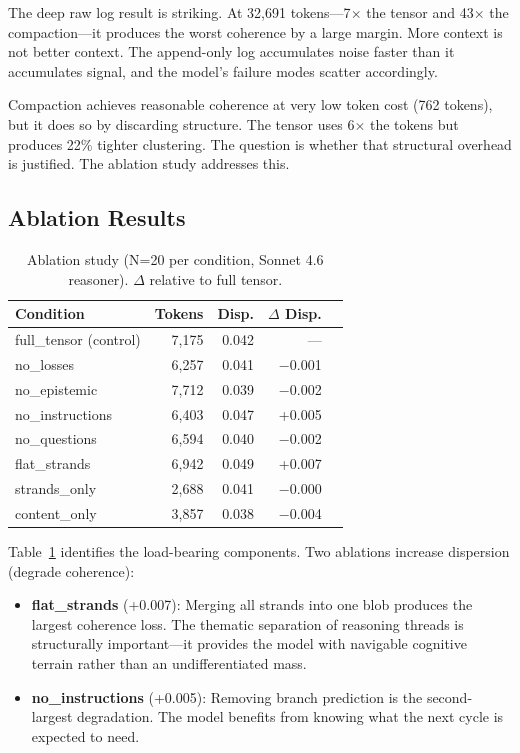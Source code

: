 \documentclass[11pt]{article}
\begin{document}
The deep raw log result is striking. At 32,691 tokens---7$\times$
the tensor and 43$\times$ the compaction---it produces the worst
coherence by a large margin. More context is not better context. The
append-only log accumulates noise faster than it accumulates signal,
and the model's failure modes scatter accordingly.

Compaction achieves reasonable coherence at very low token cost (762
tokens), but it does so by discarding structure. The tensor uses
6$\times$ the tokens but produces 22\% tighter clustering. The
question is whether that structural overhead is justified. The
ablation study addresses this.

\subsection{Ablation Results}

\begin{table}[t]
\centering
\caption{Ablation study (N=20 per condition, Sonnet 4.6 reasoner). $\Delta$ relative to full tensor.}
\label{tab:ablation}
\begin{tabular}{lrrrr}
\toprule
Condition & Tokens & Disp. & $\Delta$ Disp. \\
\midrule
full\_tensor (control) & 7,175 & 0.042 & --- \\
no\_losses & 6,257 & 0.041 & $-$0.001 \\
no\_epistemic & 7,712 & 0.039 & $-$0.002 \\
no\_instructions & 6,403 & 0.047 & +0.005 \\
no\_questions & 6,594 & 0.040 & $-$0.002 \\
flat\_strands & 6,942 & 0.049 & +0.007 \\
strands\_only & 2,688 & 0.041 & $-$0.000 \\
content\_only & 3,857 & 0.038 & $-$0.004 \\
\bottomrule
\end{tabular}
\end{table}

Table~\ref{tab:ablation} identifies the load-bearing components.
Two ablations increase dispersion (degrade coherence):

\begin{itemize}
\item \textbf{flat\_strands} (+0.007): Merging all strands into one
  blob produces the largest coherence loss. The thematic separation of
  reasoning threads is structurally important---it provides the model
  with navigable cognitive terrain rather than an undifferentiated mass.
\item \textbf{no\_instructions} (+0.005): Removing branch prediction
  is the second-largest degradation. The model benefits from knowing
  what the next cycle is expected to need.
\end{itemize}
\end{document}
